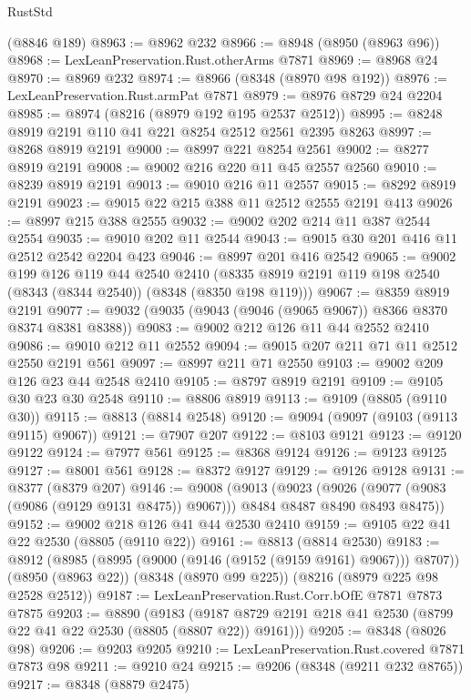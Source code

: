 \begin{lexlean}{RustStd}
\begin{coremodule}
{\begin{coremodule}
{{{{{{{{{{{{{{{{{{{{{{{{{{{{{{{{{{{{{{{{{{{{{{{{{{    (@8846 @189)
@8963 := @8962 @232
@8966 := @8948 (@8950 (@8963 @96))
@8968 := LexLeanPreservation.Rust.otherArms @7871
@8969 := @8968 @24
@8970 := @8969 @232
@8974 := @8966 (@8348 (@8970 @98 @192))
@8976 := LexLeanPreservation.Rust.armPat @7871
@8979 := @8976 @8729 @24 @2204
@8985 := @8974 (@8216 (@8979 @192 @195 @2537 @2512))
@8995 := @8248 @8919 @2191 @110 @41 @221 @8254 @2512 @2561 @2395 @8263
@8997 := @8268 @8919 @2191
@9000 := @8997 @221 @8254 @2561
@9002 := @8277 @8919 @2191
@9008 := @9002 @216 @220 @11 @45 @2557 @2560
@9010 := @8239 @8919 @2191
@9013 := @9010 @216 @11 @2557
@9015 := @8292 @8919 @2191
@9023 := @9015 @22 @215 @388 @11 @2512 @2555 @2191 @413
@9026 := @8997 @215 @388 @2555
@9032 := @9002 @202 @214 @11 @387 @2544 @2554
@9035 := @9010 @202 @11 @2544
@9043 := @9015 @30 @201 @416 @11 @2512 @2542 @2204 @423
@9046 := @8997 @201 @416 @2542
@9065 := @9002
    @199
    @126
    @119
    @44
    @2540
    @2410
    (@8335 @8919 @2191 @119 @198 @2540 (@8343 (@8344 @2540)) (@8348 (@8350 @198 @119)))
@9067 := @8359 @8919 @2191
@9077 := @9032 (@9035 (@9043 (@9046 (@9065 @9067)) @8366 @8370 @8374 @8381 @8388))
@9083 := @9002 @212 @126 @11 @44 @2552 @2410
@9086 := @9010 @212 @11 @2552
@9094 := @9015 @207 @211 @71 @11 @2512 @2550 @2191 @561
@9097 := @8997 @211 @71 @2550
@9103 := @9002 @209 @126 @23 @44 @2548 @2410
@9105 := @8797 @8919 @2191
@9109 := @9105 @30 @23 @30 @2548
@9110 := @8806 @8919
@9113 := @9109 (@8805 (@9110 @30))
@9115 := @8813 (@8814 @2548)
@9120 := @9094 (@9097 (@9103 (@9113 @9115) @9067))
@9121 := @7907 @207
@9122 := @8103 @9121
@9123 := @9120 @9122
@9124 := @7977 @561
@9125 := @8368 @9124
@9126 := @9123 @9125
@9127 := @8001 @561
@9128 := @8372 @9127
@9129 := @9126 @9128
@9131 := @8377 (@8379 @207)
@9146 := @9008
    (@9013
      (@9023
        (@9026 (@9077 (@9083 (@9086 (@9129 @9131 @8475)) @9067)))
        @8484
        @8487
        @8490
        @8493
        @8475))
@9152 := @9002 @218 @126 @41 @44 @2530 @2410
@9159 := @9105 @22 @41 @22 @2530 (@8805 (@9110 @22))
@9161 := @8813 (@8814 @2530)
@9183 := @8912
    (@8985 (@8995 (@9000 (@9146 (@9152 (@9159 @9161) @9067))) @8707))
    (@8950 (@8963 @22))
    (@8348 (@8970 @99 @225))
    (@8216 (@8979 @225 @98 @2528 @2512))
@9187 := LexLeanPreservation.Rust.Corr.bOfE @7871 @7873 @7875
@9203 := @8890
    (@9183 (@9187 @8729 @2191 @218 @41 @2530 (@8799 @22 @41 @22 @2530 (@8805 (@8807 @22)) @9161)))
@9205 := @8348 (@8026 @98)
@9206 := @9203 @9205
@9210 := LexLeanPreservation.Rust.covered @7871 @7873 @98
@9211 := @9210 @24
@9215 := @9206 (@8348 (@9211 @232 @8765))
@9217 := @8348 (@8879 @2475)
}}}}}}}}}}}}}}}}}}}}}}}}}}}}}}}}}}}}}}}}}}}}}}}}}}
\end{coremodule}}
\end{coremodule}
\end{lexlean}
